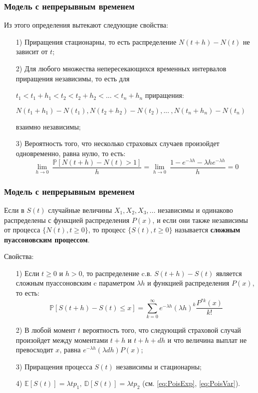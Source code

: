 \documentclass[10pt]{beamer}
\numberwithin{equation}{section}
\begin{document}
\begin{frame}
\frametitle{Модель с непрерывным временем}
\noindent
Из этого определения вытекают следующие свойства:
\begin{enumerate}
    \item[1)] Приращения стационарны, то есть распределение $N(t+h)-N(t)$ не зависит от $t$;
    \item[2)] Для любого множества непересекающихся временных интервалов приращения независимы,
    то есть для
    \par\smallskip
    $t_{1}<t_{1}+h_{1}<t_{2}<t_{2}+h_{2}<...<t_{n}+h_{n}$
    приращения:
    \par\smallskip
    $N(t_{1}+h_{1})-N(t_{1}), N(t_{2}+h_{2})-N(t_{2}),...\:,N(t_{n}+h_{n})-N(t_{n})$
    \par\smallskip
    взаимно независимы;
    \item[3)] Вероятность того, что несколько страховых случаев произойдет одновременно, равна нулю,
    то есть:
    \begin{equation*}
        \lim_{h \rightarrow 0} \: \frac{\mathbb{P}[N(t+h)-N(t)>1]}{h} =
        \lim_{h \rightarrow 0} \: \frac{1-e^{- \lambda h}- \lambda he^{- \lambda h}}{h} = 0
    \end{equation*}
\end{enumerate}
\end{frame}


\begin{frame}
\frametitle{Модель с непрерывным временем}
\noindent
Если в $S(t)$ случайные величины $X_{1}, X_{2}, X_{3}, ...$ независимы и одинаково распределены
с функцией распределения $P(x)$, и если они также независимы от процесса
$\big\{N(t), t\geq 0\big\}$, то процесс $\big\{S(t), t\geq 0\big\}$ называется
\textbf{сложным пуассоновским процессом}.
\begin{block} {Свойства:}
\begin{enumerate}
    \item[1)] Если $t\geq 0 $ и $h > 0$, то распределение c.в. $S(t + h) - S(t)$
    является сложным пуассоновским c параметром $\lambda h$ и функцией распределения $P(x)$, то есть:
    \begin{equation*}
        \mathbb{P}[S(t+h)-S(t)\leq x] = 
        \sum_{k=0}^{ \infty }e^{- \lambda h}(\lambda h)^{k} \frac{P^{\ast k}(x) }{k!}
    \end{equation*}
    \item[2)] В любой момент $t$ вероятность того, что следующий страховой случай произойдет
    между моментами $t + h$ и $t + h + dh$ и что величина выплат не превосходит $x$, равна
    $e^{-\lambda h}(\lambda dh)P(x)$;
    \item[3)] Приращения процесса $S(t)$ независимы и стационарны;
    \item[4)] $\mathbb{E}[S(t)] = \lambda t p_1,\ \mathbb{D}[S(t)] = \lambda t p_2$ (см. \ref{eq:PoisExp},
    \ref{eq:PoisVar}).
\end{enumerate}
\end{block}
\end{frame}
\end{document}
